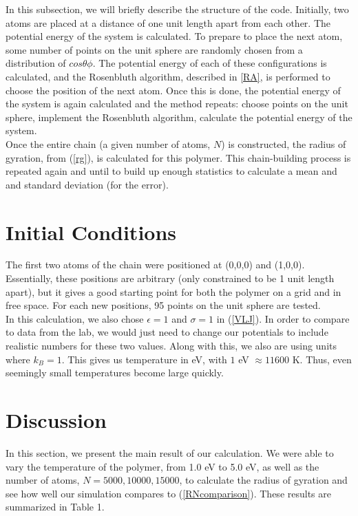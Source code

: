 \documentclass{article}
\begin{document}
\begin{multicols}{2}
In this subsection, we will briefly describe the structure of the code.  Initially, two atoms are placed at a distance of one unit length apart from each other.  The potential energy of the system is calculated.  To prepare to place the next atom, some number of points on the unit sphere are randomly chosen from a distribution of $cos\theta \phi$.  The potential energy of each of these configurations is calculated, and the Rosenbluth algorithm, described in \ref{RA}, is performed to choose the position of the next atom.  Once this is done, the potential energy of the system is again calculated and the method repeats:  choose points on the unit sphere, implement the Rosenbluth algorithm, calculate the potential energy of the system.  \\

Once the entire chain (a given number of atoms, $N$) is constructed, the radius of gyration, from (\ref{rg}), is calculated for this polymer.  This chain-building process is repeated again and until to build up enough statistics to calculate a mean and and standard deviation (for the error).  

\section{Initial Conditions}
\label{IC}

The first two atoms of the chain were positioned at (0,0,0) and (1,0,0).  Essentially, these positions are arbitrary (only constrained to be 1 unit length apart), but it gives a good starting point for both the polymer on a grid and in free space.   For each new positions, 95 points on the unit sphere are tested.  \\

In this calculation, we also chose $\epsilon =1$ and $\sigma=1$ in (\ref{VLJ}).  In order to compare to data from the lab, we would just need to change our potentials to include realistic numbers for these two values.  Along with this, we also are using units where $k_B=1$.  This gives us temperature in eV, with $1$ eV $\approx 11600$ K.  Thus, even seemingly small temperatures become large quickly.\\

\section{Discussion}
\label{discuss}

In this section, we present the main result of our calculation.  We were able to vary the temperature of the polymer, from 1.0 eV to 5.0 eV, as well as the number of atoms, $N=5000, 10000, 15000$, to calculate the radius of gyration and see how well our simulation compares to (\ref{RNcomparison}).  These results are summarized in Table 1.  \\


\end{multicols}
\end{document}
